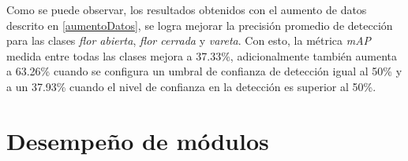 Como se puede observar, los resultados obtenidos con el aumento de datos descrito en \ref{aumentoDatos}, se logra mejorar la precisión promedio de detección para las clases \textit{flor abierta}, \textit{flor cerrada} y \textit{vareta}. Con esto, la métrica \textit{mAP} medida entre todas las clases mejora a 37.33\%, adicionalmente también aumenta a 63.26\% cuando se configura un umbral de confianza de detección igual al 50\% y a un 37.93\% cuando el nivel de confianza en la detección es superior al 50\%.

\section{Desempeño de módulos}
\label{sec:desempeñoModulos}